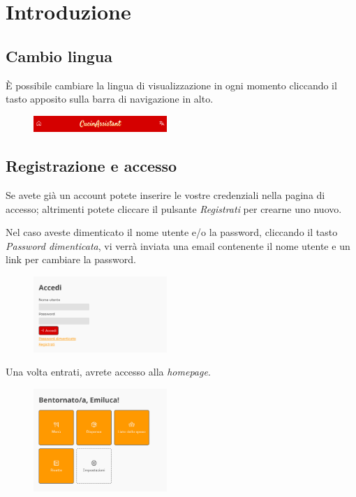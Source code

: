 \documentclass[12pt, a4paper]{article}
\begin{document}
    \section{Introduzione}

    \subsection{Cambio lingua}

    È possibile cambiare la lingua di visualizzazione in ogni momento cliccando
    il tasto apposito sulla barra di navigazione in alto.

    \begin{figure}[H]
        \centering
        \includegraphics[width=0.45\textwidth]{assets/nav.png}
    \end{figure}

    \subsection{Registrazione e accesso}

    Se avete già un account potete inserire le vostre credenziali nella pagina
    di accesso; altrimenti potete cliccare il pulsante \emph{Registrati} per
    crearne uno nuovo.

    Nel caso aveste dimenticato il nome utente e/o la password, cliccando il
    tasto \emph{Password dimenticata}, vi verrà inviata una email contenente il
    nome utente e un link per cambiare la password.

    \begin{figure}[H]
        \centering
        \includegraphics[width=0.45\textwidth]{assets/it/signin.png}
    \end{figure}

    Una volta entrati, avrete accesso alla \emph{homepage}.

    \begin{figure}[H]
        \centering
        \includegraphics[width=0.45\textwidth]{assets/it/home.png}
    \end{figure}
\end{document}
